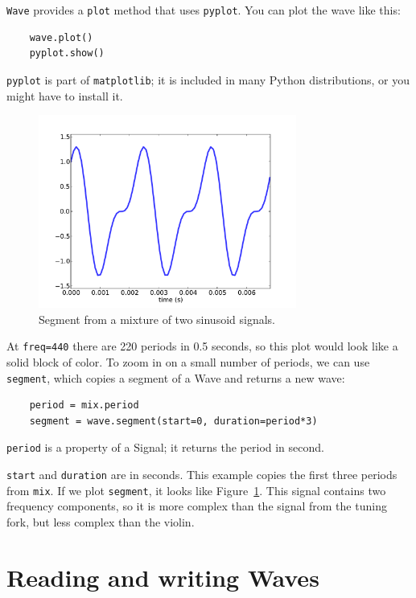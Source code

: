 \documentclass[12pt]{book}
\begin{document}
{\tt Wave} provides a {\tt plot} method that uses {\tt pyplot}.
You can plot the wave like this:

\begin{verbatim}
    wave.plot()
    pyplot.show()
\end{verbatim}

{\tt pyplot} is part of {\tt matplotlib}; it is included in many
Python distributions, or you might have to install it.

\begin{figure}
\centerline{\includegraphics[height=2.5in]{figs/example1.pdf}}
\caption{Segment from a mixture of two sinusoid signals.}
\label{fig.example1}
\end{figure}

At {\tt freq=440} there are 220 periods in 0.5 seconds, so this plot
would look like a solid block of color.  To zoom in on a small number
of periods, we can use {\tt segment}, which copies a segment of a Wave
and returns a new wave:

\begin{verbatim}
    period = mix.period
    segment = wave.segment(start=0, duration=period*3)
\end{verbatim}

{\tt period} is a property of a Signal; it returns the period in second.

{\tt start} and {\tt duration} are in seconds.  This example copies
the first three periods from {\tt mix}.  If we plot {\tt segment}, it
looks like Figure~\ref{fig.example1}.  This signal contains two
frequency components, so it is more complex than the signal from the
tuning fork, but less complex than the violin.


\section{Reading and writing Waves}
\end{document}

